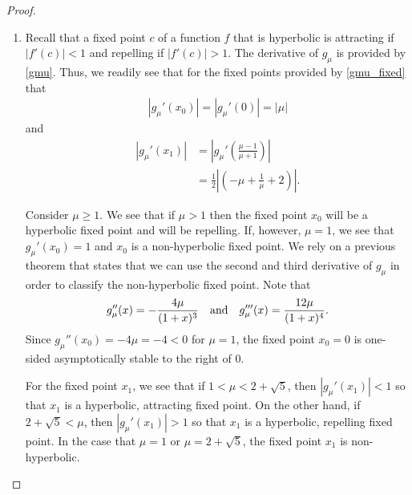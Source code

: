 \begin{proof}
\begin{enumerate}
    \item Recall that a fixed point $c$ of a function $f$ that is hyperbolic is attracting if $|f'(c)| < 1$ and
      repelling if $|f'(c)| > 1$. The derivative of $g_\mu$ is provided by \eqref{gmu}.
      Thus, we readily see that for the fixed points provided by \eqref{gmu_fixed}
      that
      \begin{align*}
        |g_\mu'(x_0)| = |g_\mu'(0)| = |\mu|
      \end{align*}
      and
      \begin{align*}
        |g_\mu'(x_1)| &= \left|g_\mu'\left(\frac{\mu-1}{\mu+1}\right)\right| \\
        &= \frac{1}{2}\left|\left(-\mu + \frac{1}{\mu} + 2\right)\right|.
      \end{align*}

      Consider $\mu \geq 1$. We see that if $\mu > 1$ then the fixed point $x_0$ will
      be a hyperbolic fixed point and will be repelling. If, however, $\mu = 1$, we see that $g_\mu'(x_0) = 1$
      and $x_0$ is a non-hyperbolic fixed point. We rely on a previous theorem that states that
      we can use the second and third derivative of $g_\mu$ in order to classify the non-hyperbolic fixed point.
      Note that
      \begin{align}\label{gmu_derivs}
        g_\mu''(x) = - \frac{4\mu}{(1 + x)^3} \text{\quad and\quad} g_\mu'''(x) = \frac{12\mu}{(1+x)^4}.
      \end{align}
      Since $g_\mu''(x_0) = -4\mu =-4 < 0$ for $\mu = 1$, the fixed point $x_0 = 0$ is
      one-sided asymptotically stable to the right of 0.

      For the fixed point $x_1$, we see that if
      $1 < \mu < 2 + \sqrt{5}$, then $|g_\mu'(x_1)| < 1$ so that
      $x_1$ is a hyperbolic, attracting fixed point. On the other hand, if $2 + \sqrt{5} < \mu$,
      then $|g_\mu'(x_1)| > 1$ so that $x_1$ is a hyperbolic, repelling fixed point.
      In the case that $\mu = 1$ or $\mu = 2 + \sqrt{5}$, the fixed point $x_1$
      is non-hyperbolic.


\end{enumerate}
\end{proof}
